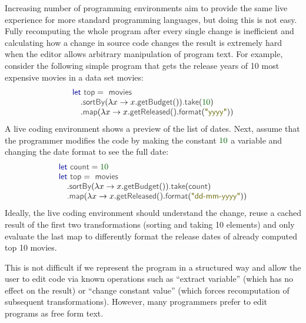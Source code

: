 \documentclass[acmsmall,anonymous,fleqn]{acmart}\settopmatter{printfolios=false,printccs=false,printacmref=false}
\theoremstyle{plain}
\theoremstyle{definition}
\newcommand{\num}[1]{\textcolor{numclr}{#1}}
\newcommand{\str}[1]{\textnormal{\textcolor{strclr}{\sffamily "#1"}}}
\newcommand{\ident}[1]{\textnormal{\textcolor{idclr}{\sffamily #1}}}
\newcommand{\kvd}[1]{\textnormal{\textcolor{kvdclr}{\sffamily #1}}}
\begin{document}
Increasing number of programming environments aim to provide the same live experience for more
standard programming languages, but doing this is not easy. Fully recomputing the whole program after
every single change is inefficient and calculating how a change in source code changes the result
is extremely hard when the editor allows arbitrary manipulation of program text. For example,
consider the following simple program that gets the release years of 10 most expensive movies
in a data set \ident{movies}:
%
\begin{equation*}
\begin{array}{l}
\kvd{let}~\ident{top} =\ident{movies}\\
\quad .\ident{sortBy}(\lambda x \rightarrow x.\ident{getBudget}())\ident{.take}(\num{10})\\
\quad .\ident{map}(\lambda x \rightarrow x.\ident{getReleased()}.\ident{format}(\str{yyyy}))\\
\end{array}
\end{equation*}
%
A live coding environment shows a preview of the list of dates. Next, assume that the programmer
modifies the code by making the constant $\num{10}$ a variable and changing the date format to see
the full date:
%
\begin{equation*}
\begin{array}{l}
\kvd{let}~\ident{count} = \num{10}\\
\kvd{let}~\ident{top} = \ident{movies}\\
\quad .\ident{sortBy}(\lambda x \rightarrow x.\ident{getBudget}())\ident{.take}(\ident{count})\\
\quad \ident{.map}(\lambda x \rightarrow x.\ident{getReleased()}.\ident{format}(\str{dd-mm-yyyy}))\\
\end{array}
\end{equation*}
%
Ideally, the live coding environment should understand the change, reuse a cached result of the
first two transformations (sorting and taking 10 elements) and only evaluate the last \ident{map}
to differently format the release dates of already computed top 10 movies.

This is not difficult if we represent the program in a structured way \cite{structure-based,hazelnut}
and allow the user to edit code via known operations such as ``extract variable'' (which has
no effect on the result) or ``change constant value'' (which forces recomputation of subsequent
transformations). However, many programmers prefer to edit programs as free form text.
\end{document}
